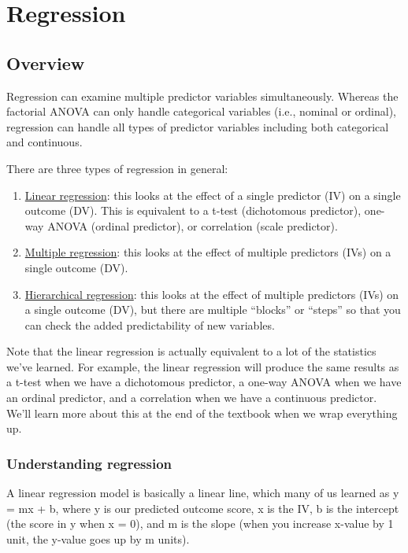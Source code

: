 \documentclass[
]{book}
\begin{document}
\hypertarget{regression}{%
\section{Regression}\label{regression}}

\hypertarget{overview-11}{%
\subsection{Overview}\label{overview-11}}

Regression can examine multiple predictor variables simultaneously. Whereas the factorial ANOVA can only handle categorical variables (i.e., nominal or ordinal), regression can handle all types of predictor variables including both categorical and continuous.

There are three types of regression in general:

\begin{enumerate}
\def\labelenumi{\arabic{enumi}.}
\item
  \underline{Linear regression}: this looks at the effect of a single predictor (IV) on a single outcome (DV). This is equivalent to a t-test (dichotomous predictor), one-way ANOVA (ordinal predictor), or correlation (scale predictor).
\item
  \underline{Multiple regression}: this looks at the effect of multiple predictors (IVs) on a single outcome (DV).
\item
  \underline{Hierarchical regression}: this looks at the effect of multiple predictors (IVs) on a single outcome (DV), but there are multiple ``blocks'' or ``steps'' so that you can check the added predictability of new variables.
\end{enumerate}

Note that the linear regression is actually equivalent to a lot of the statistics we've learned. For example, the linear regression will produce the same results as a t-test when we have a dichotomous predictor, a one-way ANOVA when we have an ordinal predictor, and a correlation when we have a continuous predictor. We'll learn more about this at the end of the textbook when we wrap everything up.

\hypertarget{understanding-regression}{%
\subsubsection{Understanding regression}\label{understanding-regression}}

A linear regression model is basically a linear line, which many of us learned as y = mx + b, where y is our predicted outcome score, x is the IV, b is the intercept (the score in y when x = 0), and m is the slope (when you increase x-value by 1 unit, the y-value goes up by m units).
\end{document}
